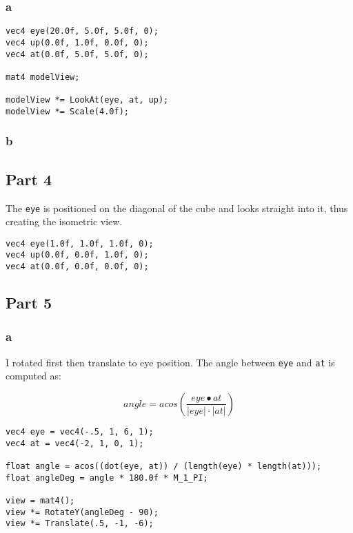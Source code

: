 \subsubsection{a}

\begin{lstlisting}
vec4 eye(20.0f, 5.0f, 5.0f, 0);
vec4 up(0.0f, 1.0f, 0.0f, 0);
vec4 at(0.0f, 5.0f, 5.0f, 0);

mat4 modelView;

modelView *= LookAt(eye, at, up);
modelView *= Scale(4.0f);
\end{lstlisting}

\subsubsection{b}


\subsection{Part 4}

The \texttt{eye} is positioned on the diagonal of the cube and looks straight into it, thus creating the isometric view.

\begin{lstlisting}
vec4 eye(1.0f, 1.0f, 1.0f, 0);
vec4 up(0.0f, 0.0f, 1.0f, 0);
vec4 at(0.0f, 0.0f, 0.0f, 0);
\end{lstlisting}

\subsection{Part 5}

\subsubsection{a}
I rotated first then translate to eye position. The angle between \texttt{eye} and \texttt{at} is computed as:

\[
angle = acos\left( \frac{eye \bullet at}{\lvert eye \rvert \cdot \lvert at \rvert}  \right)
\]


\begin{lstlisting}
vec4 eye = vec4(-.5, 1, 6, 1);
vec4 at = vec4(-2, 1, 0, 1);

float angle = acos((dot(eye, at)) / (length(eye) * length(at)));
float angleDeg = angle * 180.0f * M_1_PI;

view = mat4();
view *= RotateY(angleDeg - 90);
view *= Translate(.5, -1, -6);
\end{lstlisting}

